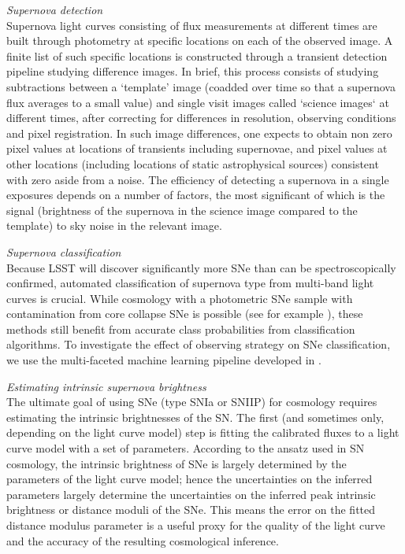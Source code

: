 {\emph{Supernova detection}}\\
Supernova light curves consisting of flux measurements at different times are built through photometry
at specific locations on each of the observed image. A finite list of such specific locations is
constructed through a transient detection pipeline studying difference images. In brief, this process 
consists of studying subtractions between a  `template' image (coadded over time so that a supernova
flux averages to a small value) and single visit images called `science images` at different times,
after correcting for differences in resolution, observing conditions and pixel registration. In such
image differences, one expects to obtain non zero pixel values at locations of transients including
supernovae, and pixel values at other locations (including locations of static astrophysical sources)
consistent with zero aside from a noise. The efficiency of detecting a supernova in a single exposures
depends on a number of factors, the most significant of which is the signal (brightness of the supernova
in the science image compared to the template) to sky noise in the relevant image.


{\emph{Supernova classification}}\\
Because LSST will discover significantly more SNe than can be spectroscopically confirmed, 
automated classification of supernova type from multi-band light curves is crucial. While cosmology 
with a photometric SNe sample with contamination from core collapse SNe is possible (see for 
example \citet{Kunz2007,Newling2011,Hlozek2012,Knights2013,Bernstein2012,Campbell2013,Rubin2015}), 
these methods still benefit from accurate class probabilities from classification algorithms. To 
investigate the effect of observing strategy on SNe classification, we use the multi-faceted machine 
learning pipeline developed in \citet{Lochner2016}.


{\emph{Estimating intrinsic supernova brightness}}\\
The ultimate goal of using SNe (type SNIa or
SNIIP) for cosmology requires estimating the intrinsic brightnesses of
the SN. The first (and sometimes only, depending on the light curve
model) step is fitting the calibrated fluxes to a light curve model with
a set of parameters. According to the ansatz used in SN cosmology, the
intrinsic brightness of SNe is largely determined by the parameters of
the light curve model; hence the uncertainties on the inferred
parameters largely determine the uncertainties on the inferred peak
intrinsic brightness or distance moduli of the SNe. This means the error on the fitted distance 
modulus parameter is a useful proxy for the quality of the light curve and the accuracy of 
the resulting cosmological inference.


